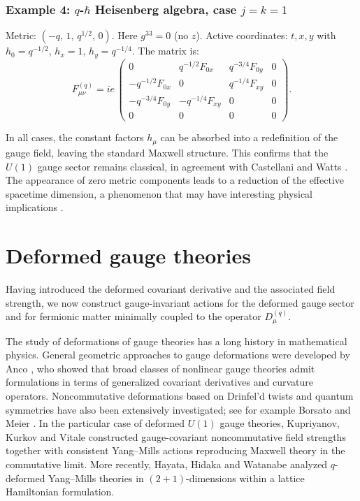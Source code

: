 \documentclass[12pt,a4paper]{article}
\theoremstyle{plain}
\theoremstyle{definition}
\begin{document}
\subsubsection*{Example 4: \(q\)-\(\hbar\) Heisenberg algebra, case \(j=k=1\)}
Metric: \((-q,\,1,\,q^{1/2},\,0)\).  
Here \(g^{33}=0\) (no \(z\)). Active coordinates: \(t,x,y\) with
\(h_0 = q^{-1/2}\), \(h_x = 1\), \(h_y = q^{-1/4}\). The matrix is:
\[
F_{\mu\nu}^{(q)} = ie\,
\begin{pmatrix}
0 & q^{-1/2}F_{0x} & q^{-3/4}F_{0y} & 0 \\
-q^{-1/2}F_{0x} & 0 & q^{-1/4}F_{xy} & 0 \\
-q^{-3/4}F_{0y} & -q^{-1/4}F_{xy} & 0 & 0 \\
0 & 0 & 0 & 0
\end{pmatrix}.
\]

In all cases, the constant factors \(h_\mu\) can be absorbed into a redefinition of the gauge field, leaving the standard Maxwell structure. This confirms that the \(U(1)\) gauge sector remains classical, in agreement with Castellani \cite{Castellani1992} and Watts \cite{Watts1997}. The appearance of zero metric components leads to a reduction of the effective spacetime dimension, a phenomenon that may have interesting physical implications \cite{vanNuland2021}.




\section{Deformed gauge theories}
\label{sec:gaugeactions}

Having introduced the deformed covariant derivative and the associated field strength, we now construct gauge-invariant actions for the deformed gauge sector and for fermionic matter minimally coupled to the operator \(D_\mu^{(q)}\).

The study of deformations of gauge theories has a long history in mathematical physics. General geometric approaches to gauge deformations were developed by Anco \cite{Anco2004}, who showed that broad classes of nonlinear gauge theories admit formulations in terms of generalized covariant derivatives and curvature operators. Noncommutative deformations based on Drinfel'd twists and quantum symmetries have also been extensively investigated; see for example Borsato and Meier \cite{BorsatoMeier2025}. In the particular case of deformed \(U(1)\) gauge theories, Kupriyanov, Kurkov and Vitale \cite{Kupriyanov2020} constructed gauge-covariant noncommutative field strengths together with consistent Yang--Mills actions reproducing Maxwell theory in the commutative limit. More recently, Hayata, Hidaka and Watanabe \cite{Hayata2026} analyzed \(q\)-deformed Yang--Mills theories in \((2+1)\)-dimensions within a lattice Hamiltonian formulation.
\end{document}
